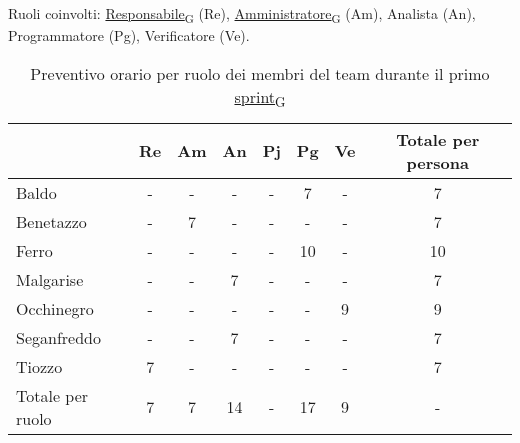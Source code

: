 \newpage
{}
Ruoli coinvolti: \href{https://7last.github.io/docs/rtb/documentazione-interna/glossario\#responsabile}{Responsabile\textsubscript{G}} (Re), \href{https://7last.github.io/docs/rtb/documentazione-interna/glossario\#amministratore}{Amministratore\textsubscript{G}} (Am), Analista (An), Programmatore (Pg), Verificatore (Ve).
\begin{table}[!h]
	\centering
	\begin{tabular}{ | l | c | c | c | c | c | c | c | }
		\hline
		\textbf{}        & \textbf{Re} & \textbf{Am} & \textbf{An} & \textbf{Pj} & \textbf{Pg} & \textbf{Ve} & \textbf{Totale per persona} \\
		\hline
		Baldo            & -           & -           & -           & -           & 7           & -           & 7                           \\
		Benetazzo        & -           & 7           & -           & -           & -           & -           & 7                           \\
		Ferro            & -           & -           & -           & -           & 10          & -           & 10                          \\
		Malgarise        & -           & -           & 7           & -           & -           & -           & 7                           \\
		Occhinegro       & -           & -           & -           & -           & -           & 9           & 9                           \\
		Seganfreddo      & -           & -           & 7           & -           & -           & -           & 7                           \\
		Tiozzo           & 7           & -           & -           & -           & -           & -           & 7                           \\
		\hline
		Totale per ruolo & 7           & 7           & 14          & -           & 17          & 9           & -                           \\
		\hline
	\end{tabular}
	\caption{Preventivo orario per ruolo dei membri del team durante il primo \href{https://7last.github.io/docs/rtb/documentazione-interna/glossario\#sprint}{sprint\textsubscript{G}}}
	
\end{table}

